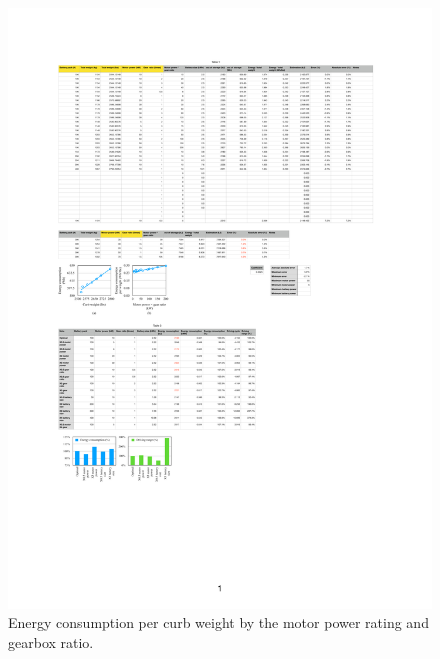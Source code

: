 \documentclass[journal]{IEEEtran}
\begin{document}
\begin{figure}
\centering
\includegraphics[width=1.0\hsize]{Figures/E_generic.pdf}
\caption{Energy consumption per curb weight by the motor power rating and gearbox ratio.}
\label{fig:E_generic}
\end{figure}


\end{document}
